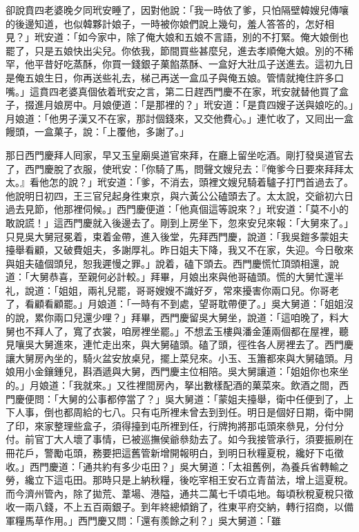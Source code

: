 卻說賁四老婆晚夕同玳安睡了，因對他說：「我一時依了爹，只怕隔壁韓嫂兒傳嚷的後邊知道，也似韓夥計娘子，一時被你娘們說上幾句，羞人答答的，怎好相見？」玳安道：「如今家中，除了俺大娘和五娘不言語，別的不打緊。俺大娘倒也罷了，只是五娘快出尖兒。你依我，節間買些甚麼兒，進去孝順俺大娘。別的不稀罕，他平昔好吃蒸酥，你買一錢銀子菓餡蒸酥、一盒好大壯瓜子送進去。這初九日是俺五娘生日，你再送些礼去，梯己再送一盒瓜子與俺五娘。管情就掩住許多口嘴。」{}這賁四老婆真個依着玳安之言，第二日趕西門慶不在家，玳安就替他買了盒子，掇進月娘房中。月娘便道：「是那裡的？」玳安道：「是賁四嫂子送與娘吃的。」月娘道：「他男子漢又不在家，那討個錢來，又交他費心。」連忙收了，又囘出一盒饅頭，一盒菓子，說：「上覆他，多謝了。」

那日西門慶拜人囘家，早又玉皇廟吳道官來拜，在廳上留坐吃酒。剛打發吳道官去了，西門慶脫了衣服，使玳安：「你騎了馬，問聲文嫂兒去：『俺爹今日要來拜拜太太。』看他怎的說？」玳安道：「爹，不消去，頭裡文嫂兒騎着驢子打門首過去了。他說明日初四，王三官兒起身徃東京，與六黃公公磕頭去了。太太說，交爺初六日過去見節，他那裡伺候。」西門慶便道：「他真個這等說來？」玳安道：「莫不小的敢說謊！」這西門慶就入後邊去了。剛到上房坐下，忽來安兒來報：「大舅來了。」只見吳大舅冠冕着，束着金帶，進入後堂，先拜西門慶，說道：「我吳鎧多蒙姐夫擡舉看顧，又破費姐夫，多謝厚礼。昨日姐夫下降，我又不在家，失迎。今日敬來與姐夫磕個頭兒，恕我遲慢之罪。」說着，磕下頭去。西門慶慌忙頂頭相還，說道：「大舅恭喜，至親何必計較。」拜畢，月娘出來與他哥磕頭。慌的大舅忙還半礼，說道：「姐姐，兩礼兒罷，哥哥嫂嫂不識好歹，常來擾害你兩口兒。你哥老了，看顧看顧罷。」月娘道：「一時有不到處，望哥耽帶便了。」吳大舅道：「姐姐沒的說，累你兩口兒還少哩？」拜畢，西門慶留吳大舅坐，說道：「這咱晚了，料大舅也不拜人了，寬了衣裳，咱房裡坐罷。」不想孟玉樓與潘金蓮兩個都在屋裡，聽見嚷吳大舅進來，連忙走出來，與大舅磕頭。磕了頭，徑徃各人房裡去了。西門慶讓大舅房內坐的，騎火盆安放桌兒，擺上菜兒來。小玉、玉簫都來與大舅磕頭。月娘用小金鑲鍾兒，斟酒遞與大舅，西門慶主位相陪。吳大舅讓道：「姐姐你也來坐的。」月娘道：「我就來。」又徃裡間房內，拏出數樣配酒的菓菜來。飲酒之間，西門慶便問：「大舅的公事都停當了？」吳大舅道：「蒙姐夫擡舉，衛中任便到了，上下人事，倒也都周給的七八。只有屯所裡未曾去到到任。明日是個好日期，衛中開了印，來家整理些盒子，須得擡到屯所裡到任，行牌拘將那屯頭來叅見，分付分付。前官丁大人壞了事情，已被巡撫侯爺叅劾去了。如今我接管承行，須要振刷在冊花戶，警勵屯頭，務要把這舊管新增開報明白，到明日秋糧夏稅，纔好下屯徵收。」西門慶道：「通共約有多少屯田？」吳大舅道：「太祖舊例，為養兵省轉輸之勞，纔立下這屯田。那時只是上納秋糧，後吃宰相王安石立青苗法，增上這夏稅。而今濟州管內，除了拋荒、葦場、港隘，通共二萬七千頃屯地。每頃秋稅夏稅只徵收一兩八錢，不上五百兩銀子。到年終總傾銷了，徃東平府交納，轉行招商，以備軍糧馬草作用。」西門慶又問：「還有羨餘之利？」吳大舅道：「雖